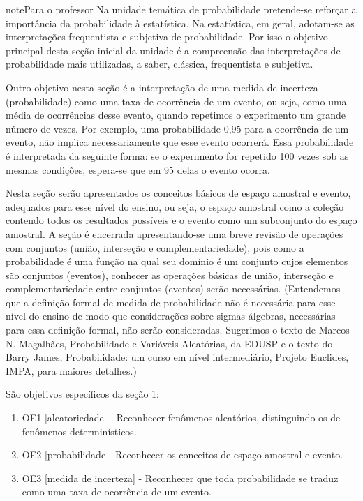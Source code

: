 \begin{sphinxadmonition}{note}{Para o professor}
Na unidade temática de probabilidade pretende-se reforçar a importância da probabilidade à estatística. Na estatística, em geral, adotam-se as interpretações frequentista e subjetiva de probabilidade. Por isso o objetivo principal desta seção inicial da unidade é a compreensão das interpretações de probabilidade mais utilizadas, a saber, clássica, frequentista e subjetiva.

Outro objetivo nesta seção é a interpretação de uma medida de incerteza (probabilidade) como uma taxa de ocorrência de um evento, ou seja, como uma média de ocorrências desse evento, quando repetimos o experimento um grande número de vezes. Por exemplo, uma probabilidade 0,95 para a ocorrência de um evento, não implica necessariamente que esse evento ocorrerá. Essa probabilidade é interpretada da seguinte forma: se o experimento for repetido 100 vezes sob as mesmas condições, espera-se que em     95 delas o evento ocorra.

Nesta seção serão apresentados os conceitos básicos de espaço amostral e evento, adequados para esse nível do ensino, ou seja, o espaço amostral como a coleção contendo todos os resultados possíveis e o evento como um subconjunto do espaço amostral. A seção é encerrada apresentando-se uma breve revisão de operações com conjuntos (união, interseção e complementariedade), pois como a probabilidade é uma função na qual seu domínio é um conjunto cujos elementos são conjuntos (eventos), conhecer as operações básicas de união, interseção e complementariedade entre conjuntos (eventos) serão necessárias. (Entendemos que a definição formal de medida de probabilidade não é necessária para esse nível do ensino de modo que considerações sobre sigmas-álgebras, necessárias para essa definição formal, não serão consideradas. Sugerimos o texto de Marcos N. Magalhães, Probabilidade e Variáveis Aleatórias, da EDUSP e o texto do Barry James, Probabilidade: um curso em nível intermediário, Projeto Euclides, IMPA, para maiores detalhes.)

São objetivos específicos da seção 1:
\begin{enumerate}
\item {} 
OE1 {[}aleatoriedade{]} - Reconhecer fenômenos aleatórios, distinguindo-os de fenômenos determinísticos.

\item {} 
OE2 {[}probabilidade - Reconhecer os conceitos de espaço amostral e evento.

\item {} 
OE3 {[}medida de incerteza{]} -  Reconhecer que toda probabilidade se traduz como uma taxa de ocorrência de um evento.


\end{enumerate}
\end{sphinxadmonition}
